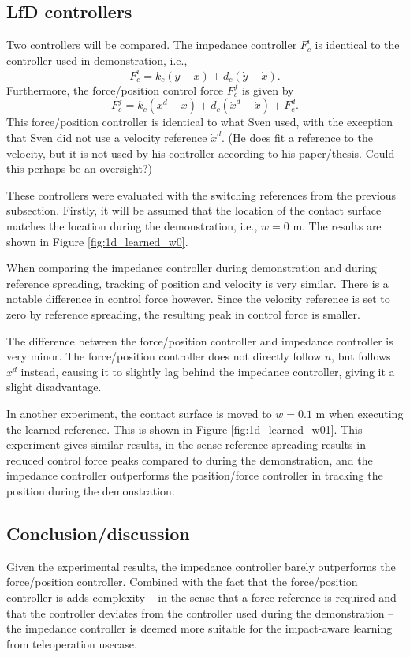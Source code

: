 \documentclass[11pt]{report}
\numberwithin{equation}{section}        %
\numberwithin{figure}{section}          %
\numberwithin{table}{section}           %
\begin{document}
  \subsection{LfD controllers}
  Two controllers will be compared. The impedance controller $F_c^i$ is identical to the controller used in demonstration, i.e.,
  $$ F_c^i = k_c(y-x)+d_c(\dot{y}-\dot{x}).$$
  Furthermore, the force/position control force $F_c^f$ is given by
  $$ F_c^f = k_c(x^d-x)+d_c(\dot{x}^d-\dot{x}) + F_e^d.$$  
  This force/position controller is identical to what Sven used, with the exception that Sven did not use a velocity reference $\dot{x}^d$. (He does fit a reference to the velocity, but it is not used by his controller according to his paper/thesis. Could this perhaps be an oversight?)%

  These controllers were evaluated with the switching references from the previous subsection. Firstly, it will be assumed that the location of the contact surface matches the location during the demonstration, i.e., $w=0$ m. The results are shown in Figure \ref{fig:1d_learned_w0}.

  When comparing the impedance controller during demonstration and during reference spreading, tracking of position and velocity is very similar. There is a notable difference in control force however. Since the velocity reference is set to zero by reference spreading, the resulting peak in control force is smaller. 

  The difference between the force/position controller and impedance controller is very minor. The force/position controller does not directly follow $u$, but follows $x^d$ instead, causing it to slightly lag behind the impedance controller, giving it a slight disadvantage.

  In another experiment, the contact surface is moved to $w=0.1$ m when executing the learned reference. This is shown in Figure \ref{fig:1d_learned_w01}. This experiment gives similar results, in the sense reference spreading results in reduced control force peaks compared to during the demonstration, and the impedance controller outperforms the position/force controller in tracking the position during the demonstration.

  \subsection{Conclusion/discussion}
  Given the experimental results, the impedance controller barely outperforms the force/position controller. Combined with the fact that the force/position controller is adds complexity -- in the sense that a force reference is required and that the controller deviates from the controller used during the demonstration -- the impedance controller is deemed more suitable for the impact-aware learning from teleoperation usecase.
\end{document}
